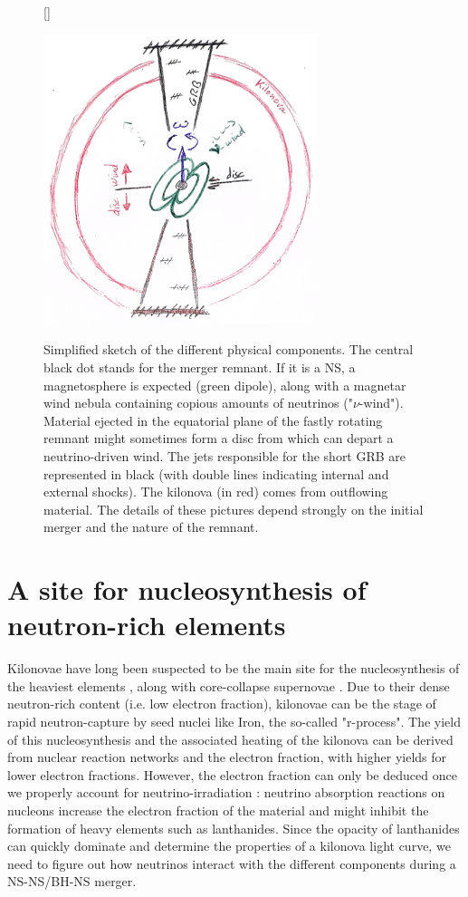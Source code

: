 \documentclass[12pt,onecolumn]{article}
\makeatletter
\newcommand{\grb}{GRB\xspace}
\newcommand*{\ns}{NS\@\xspace}
\newcommand*{\bh}{BH\@\xspace}
\newcommand*{\ie}{i.e.\@\xspace}
\makeatother
\begin{document}
\begin{figure}[!b]
[\FBwidth]
{\caption{Simplified sketch of the different physical components. The central black dot stands for the merger remnant. If it is a \ns, a magnetosphere is expected (green dipole), along with a magnetar wind nebula containing copious amounts of neutrinos ("$\nu$-wind"). Material ejected in the equatorial plane of the fastly rotating remnant might sometimes form a disc from which can depart a neutrino-driven wind. The jets responsible for the short \grb are represented in black (with double lines indicating internal and external shocks). The kilonova (in red) comes from outflowing material. The details of these pictures depend strongly on the initial merger and the nature of the remnant.}\label{fig:sketch}}
{\includegraphics[width=8cm]{Figures/sketch_GRB_kilonova.jpg}}
\end{figure}

\section{A site for nucleosynthesis of neutron-rich elements}

Kilonovae have long been suspected to be the main site for the nucleosynthesis of the heaviest elements \citep{Lattimer1974}, along with core-collapse supernovae \citep{MacFadyen1999}. Due to their dense neutron-rich content (\ie low electron fraction), kilonovae can be the stage of rapid neutron-capture by seed nuclei like Iron, the so-called "r-process". The yield of this nucleosynthesis and the associated heating of the kilonova can be derived from nuclear reaction networks \citep{Metzger2010} and the electron fraction, with higher yields for lower electron fractions. However, the electron fraction can only be deduced once we properly account for neutrino-irradiation : neutrino absorption reactions on nucleons increase the electron fraction of the material and might inhibit the formation of heavy elements such as lanthanides. Since the opacity of lanthanides can quickly dominate and determine the properties of a kilonova light curve, we need to figure out how neutrinos interact with the different components during a \ns-\ns/\bh-\ns merger.
\end{document}
